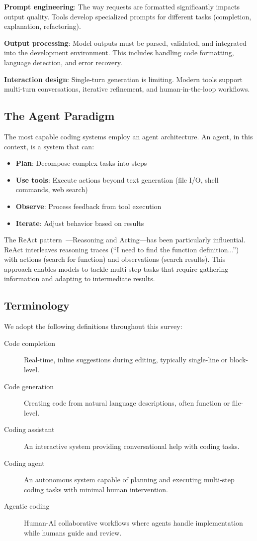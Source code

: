 \textbf{Prompt engineering}: The way requests are formatted significantly impacts output quality. Tools develop specialized prompts for different tasks (completion, explanation, refactoring).

\textbf{Output processing}: Model outputs must be parsed, validated, and integrated into the development environment. This includes handling code formatting, language detection, and error recovery.

\textbf{Interaction design}: Single-turn generation is limiting. Modern tools support multi-turn conversations, iterative refinement, and human-in-the-loop workflows.

\subsection{The Agent Paradigm}

The most capable coding systems employ an agent architecture. An agent, in this context, is a system that can:
\begin{itemize}
    \item \textbf{Plan}: Decompose complex tasks into steps
    \item \textbf{Use tools}: Execute actions beyond text generation (file I/O, shell commands, web search)
    \item \textbf{Observe}: Process feedback from tool execution
    \item \textbf{Iterate}: Adjust behavior based on results
\end{itemize}

The ReAct pattern~\citep{yao2022react}---Reasoning and Acting---has been particularly influential. ReAct interleaves reasoning traces (``I need to find the function definition...'') with actions (search for function) and observations (search results). This approach enables models to tackle multi-step tasks that require gathering information and adapting to intermediate results.

\subsection{Terminology}

We adopt the following definitions throughout this survey:

\begin{description}
    \item[Code completion] Real-time, inline suggestions during editing, typically single-line or block-level.
    \item[Code generation] Creating code from natural language descriptions, often function or file-level.
    \item[Coding assistant] An interactive system providing conversational help with coding tasks.
    \item[Coding agent] An autonomous system capable of planning and executing multi-step coding tasks with minimal human intervention.
    \item[Agentic coding] Human-AI collaborative workflows where agents handle implementation while humans guide and review.
\end{description}
